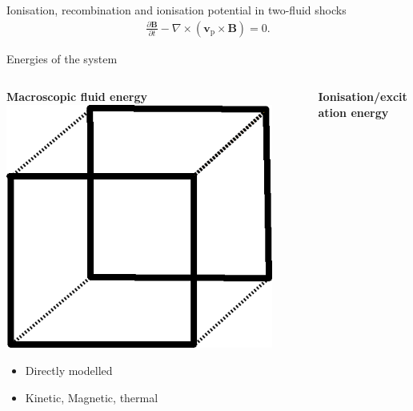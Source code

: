 \documentclass[10pt,aspectratio=169,usenames,dvipsnames]{beamer}
\begin{document}
\begin{frame}{Ionisation, recombination and ionisation potential in two-fluid shocks}
\begin{gather}
\frac{\partial \textbf{B}}{\partial t} - \nabla \times (\textbf{v}_{\text{p}} \times \textbf{B}) = 0.\tag{11}
\end{gather}
\end{frame}


\begin{frame}{Energies of the system}
\begin{columns}
\begin{column}{0.3\textwidth}
\centering
\textbf{Macroscopic fluid energy}
\includegraphics[width=0.9\textwidth]{2023ECRW/Figures/fluidelement.png}
\begin{itemize}
    \item Directly modelled
    \item Kinetic, Magnetic, thermal
\end{itemize}
\end{column}
\begin{column}{0.3\textwidth}
\centering
\textbf{Ionisation/excitation energy}

\end{column}
\end{columns}
\end{frame}
\end{document}
